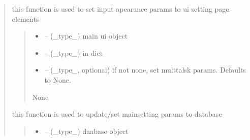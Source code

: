\documentclass[letterpaper,10pt,english]{sphinxmanual}
\begin{document}
\begin{quote}
\begin{savenotes}\begin{fulllineitems}
\label{\detokenize{setting/backend/mainsetting_funcs:oxin.backend.mainsetting_funcs.set_appearance_params_to_ui}}
\pysigstartsignatures
{}
\pysigstopsignatures
\sphinxAtStartPar
this function is used to set input apearance params to ui setting page elements
\begin{quote}\begin{description}
\begin{itemize}
\item {} 
\sphinxAtStartPar
{} – (\_type\_) main ui object

\item {} 
\sphinxAtStartPar
{} – (\_type\_) in dict

\item {} 
\sphinxAtStartPar
{} – (\_type\_, optional) if not none, set multtalsk params. Defaults to None.

\end{itemize}

\sphinxAtStartPar
None

\end{description}\end{quote}

\end{fulllineitems}\end{savenotes}


\begin{savenotes}\begin{fulllineitems}
\label{\detokenize{setting/backend/mainsetting_funcs:oxin.backend.mainsetting_funcs.set_mainsetting_params_to_db}}
\pysigstartsignatures
{}
\pysigstopsignatures
\sphinxAtStartPar
this function is used to update/set mainsetting params to database
\begin{quote}\begin{description}
\begin{itemize}
\item {} 
\sphinxAtStartPar
{} – (\_type\_) daabase object


\end{itemize}
\end{description}
\end{quote}
\end{fulllineitems}
\end{savenotes}
\end{quote}
\end{document}
